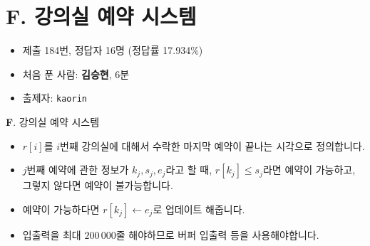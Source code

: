 \section{F. 강의실 예약 시스템}

\begin{frame} %
    \begin{itemize}
        \item 제출 184번, 정답자 16명 (정답률 17.934\%)
        \item 처음 푼 사람: \textbf{김승현}, 6분
        \item 출제자: \texttt{kaorin}
    \end{itemize}
\end{frame}

\begin{frame}{\textbf{F}. 강의실 예약 시스템}
    \begin{itemize}
        \item $r[i]$를 $i$번째 강의실에 대해서 수락한 마지막 예약이 끝나는 시각으로 정의합니다.
        \item $j$번째 예약에 관한 정보가 $k_j, s_j, e_j$라고 할 때, $r[k_j] \le s_j$라면 예약이 가능하고, 그렇지 않다면 예약이 불가능합니다.
        \item 예약이 가능하다면 $r[k_j] \leftarrow e_j$로 업데이트 해줍니다.
        \item 입출력을 최대 $200\,000$줄 해야하므로 버퍼 입출력 등을 사용해야합니다.
    \end{itemize}
\end{frame}